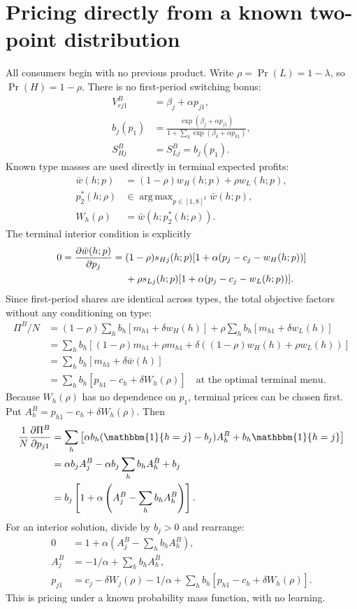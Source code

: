 \documentclass[12pt]{article}
\theoremstyle{definition}
\theoremstyle{remark}
\DeclareMathOperator{\argmax}{arg\,max}
\newcommand{\ind}{\mathbbm{1}}
\numberwithin{equation}{section}
\begin{document}
\section{Pricing directly from a known two-point distribution}
All consumers begin with no previous product. Write $\rho=\Pr(L)=1-\lambda$, so
$\Pr(H)=1-\rho$. There is no first-period switching bonus:
\begin{align}
 V_{rj1}^{B}&=\beta_j+\alpha p_{j1},\\
 b_j(p_1)&=\frac{\exp(\beta_j+\alpha p_{j1})}
                    {1+\sum_k\exp(\beta_k+\alpha p_{k1})},\\
 S_{Hj}^{B}&=S_{Lj}^{B}=b_j(p_1).
\end{align}
Known type masses are used directly in terminal expected profits:
\begin{align}
 \bar w(h;p)&=(1-\rho)w_H(h;p)+\rho w_L(h;p),\\
 p_2^*(h;\rho)&\in\argmax_{p\in[1,8]^2}\bar w(h;p),\\
 W_h(\rho)&=\bar w(h;p_2^*(h;\rho)).
\end{align}
The terminal interior condition is explicitly
\begin{align}
 0=\frac{\partial\bar w(h;p)}{\partial p_j}
 ={}&(1-\rho)s_{Hj}(h;p)[1+\alpha(p_j-c_j-w_H(h;p))]\notag\\
 &+\rho s_{Lj}(h;p)[1+\alpha(p_j-c_j-w_L(h;p))].
\end{align}
Since first-period shares are identical across types, the total objective
factors without any conditioning on type:
\begin{align}
 \Pi^{B}/N
 &=(1-\rho)\sum_hb_h[m_{h1}+\delta w_H(h)]
       +\rho\sum_hb_h[m_{h1}+\delta w_L(h)]\\
 &=\sum_hb_h[(1-\rho)m_{h1}+\rho m_{h1}
                 +\delta((1-\rho)w_H(h)+\rho w_L(h))]\\
 &=\sum_hb_h[m_{h1}+\delta\bar w(h)]\\
 &=\sum_hb_h[p_{h1}-c_h+\delta W_h(\rho)]
       \quad\text{at the optimal terminal menu}.
\end{align}
Because $W_h(\rho)$ has no dependence on $p_1$, terminal prices can be chosen
first. Put $A_h^B=p_{h1}-c_h+\delta W_h(\rho)$. Then
\begin{align}
 \frac1N\frac{\partial\Pi^B}{\partial p_{j1}}
 &=\sum_h\left[\alpha b_h(\ind\{h=j\}-b_j)A_h^B
                                  +b_h\ind\{h=j\}\right]\\
 &=\alpha b_jA_j^B-\alpha b_j\sum_hb_hA_h^B+b_j\\
 &=b_j\left[1+\alpha\left(A_j^B-\sum_hb_hA_h^B\right)\right].
\end{align}
For an interior solution, divide by $b_j>0$ and rearrange:
\begin{align}
 0&=1+\alpha\left(A_j^B-\sum_hb_hA_h^B\right),\\
 A_j^B&=-1/\alpha+\sum_hb_hA_h^B,\\
 p_{j1}&=c_j-\delta W_j(\rho)-1/\alpha
                   +\sum_hb_h[p_{h1}-c_h+\delta W_h(\rho)].
\end{align}
This is pricing under a known probability mass function, with no learning.
\end{document}
